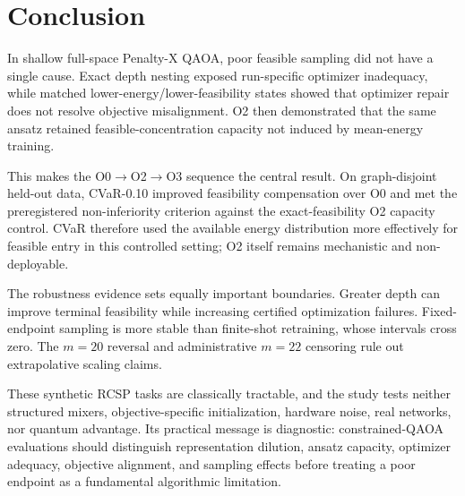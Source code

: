 \section{Conclusion}
\label{sec:conclusion}

In shallow full-space Penalty-X QAOA, poor feasible sampling did not have a
single cause. Exact depth nesting exposed run-specific optimizer inadequacy,
while matched lower-energy/lower-feasibility states showed that optimizer
repair does not resolve objective misalignment. O2 then demonstrated that the
same ansatz retained feasible-concentration capacity not induced by
mean-energy training.

This makes the O0$\rightarrow$O2$\rightarrow$O3 sequence the central result.
On graph-disjoint held-out data, CVaR-0.10 improved feasibility compensation
over O0 and met the preregistered non-inferiority criterion against the
exact-feasibility O2 capacity control. CVaR therefore used the available
energy distribution more effectively for feasible entry in this controlled
setting; O2 itself remains mechanistic and non-deployable.

The robustness evidence sets equally important boundaries. Greater depth can
improve terminal feasibility while increasing certified optimization
failures. Fixed-endpoint sampling is more stable than finite-shot retraining,
whose intervals cross zero. The $m=20$ reversal and administrative $m=22$
censoring rule out extrapolative scaling claims.

These synthetic RCSP tasks are classically tractable, and the study tests
neither structured mixers, objective-specific initialization, hardware noise,
real networks, nor quantum advantage. Its practical message is diagnostic:
constrained-QAOA evaluations should distinguish representation dilution,
ansatz capacity, optimizer adequacy, objective alignment, and sampling effects
before treating a poor endpoint as a fundamental algorithmic limitation.
